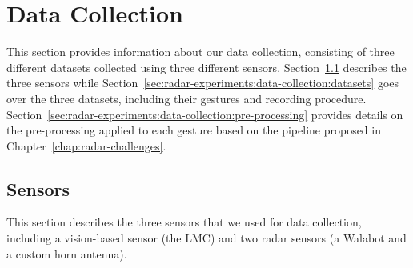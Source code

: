 \section{Data Collection} \label{sec:radar-experiments:data-collection}
This section provides information about our data collection, consisting of three different datasets collected using three different sensors. 
Section~\ref{sec:radar-experiments:data-collection:sensors} describes the three sensors while Section~\ref{sec:radar-experiments:data-collection:datasets} goes over the three datasets, including their gestures and recording procedure.
Section~\ref{sec:radar-experiments:data-collection:pre-processing} provides details on the pre-processing applied to each gesture based on the pipeline proposed in Chapter~\ref{chap:radar-challenges}.

\subsection{Sensors} \label{sec:radar-experiments:data-collection:sensors}
This section describes the three sensors that we used for data collection, including a vision-based sensor (the LMC) and two radar sensors (a Walabot and a custom horn antenna).

